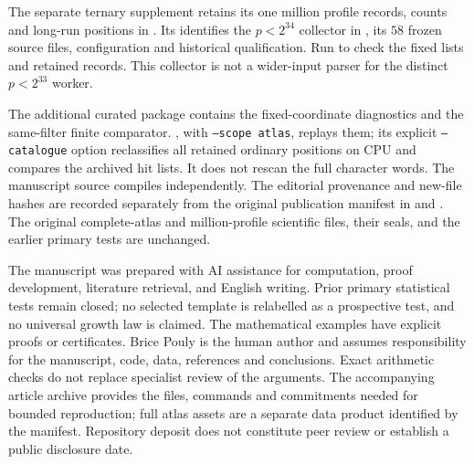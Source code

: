 \documentclass[11pt]{article}
\theoremstyle{definition}\newtheorem{definition}[theorem]{Definition}
\begin{document}
The separate ternary supplement retains its one million profile records,
counts and long-run positions in .
Its  identifies the $p<2^{34}$ collector in
, its $58$ frozen source files, configuration
and historical qualification. Run  to
check the fixed lists and retained records. This collector is not a
wider-input parser for the distinct $p<2^{33}$ worker.

The additional curated package
contains the fixed-coordinate diagnostics and the same-filter
finite comparator.
, with \texttt{--scope atlas}, replays them;
its explicit \texttt{--catalogue} option reclassifies
all retained ordinary positions on CPU and compares
the archived hit lists. It does not rescan the
full character words.
The manuscript source compiles independently.
The editorial provenance and new-file hashes
are recorded separately from the original
publication manifest in
 and
.
The original complete-atlas and million-profile
scientific files, their seals, and the earlier
primary tests are unchanged.

The manuscript was prepared with AI assistance for computation,
proof development, literature retrieval, and English writing.
Prior primary statistical tests remain closed; no selected
template is relabelled as a prospective test, and no universal
growth law is claimed. The mathematical examples have explicit proofs or certificates.
Brice Pouly is the human author and assumes responsibility for the
manuscript, code, data, references and conclusions. Exact arithmetic
checks do not replace specialist review of the arguments. The
accompanying article archive provides the files, commands and commitments
needed for bounded reproduction; full atlas assets are a separate data
product identified by the manifest. Repository deposit does not
constitute peer review or establish a public disclosure date.

\appendix
\end{document}
